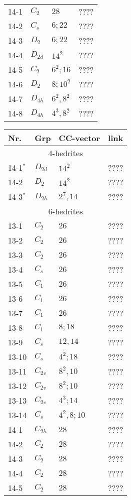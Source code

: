 \documentclass[12pt]{article}
\begin{document}
\begin{table}
\begin{center}
{\begin{minipage}{6cm}
\begin{tabular}{||l|l|l|l||}
14-1	&$C_2$	&$28$		&????\\
14-2	&$C_s$	&$6; 22$		&????\\
14-3	&$D_2$	&$6; 22$		&????\\
14-4	&$D_{2d}$	&$14^2$		&????\\
14-5	&$C_2$	&$6^2; 16$	&????\\
14-6	&$D_2$	&$8; 10^2$	&????\\
14-7	&$D_{4h}$	&$6^2, 8^2$	&????\\
14-8	&$D_{4h}$	&$4^3, 8^2$	&????\\\hline
\end{tabular}
\end{minipage}
\begin{minipage}[t]{6cm}
\begin{tabular}{||l|l|l|l||}
\hline
Nr.	&Grp 	&CC-vector	&link\\\hline
\multicolumn{4}{||c||}{$4$-hedrites}\\\hline
14-1${}^*$&$D_{2d}$	&$14^2$		&????\\\hline
14-2	&$D_2$	&$14^2$		&????\\	
14-3${}^*$&$D_{2h}$       &$2^7, 14$      &????\\
\hline
\multicolumn{4}{||c||}{$6$-hedrites}\\\hline
13-1	&$C_2$	&$26$		&????\\
13-2 	&$C_2$	&$26$		&????\\
13-3 	&$C_2$	&$26$		&????\\
13-4 	&$C_s$	&$26$		&????\\
13-5 	&$C_1$	&$26$		&????\\
13-6	&$C_1$	&$26$		&????\\
13-7	&$C_1$	&$26$		&????\\
13-8	&$C_1$	&$8; 18$		&????\\
13-9	&$C_s$	&$12, 14$		&????\\
13-10	&$C_s$	&$4^2; 18$	&????\\
13-11	&$C_{2v}$	&$8^2, 10$	&????\\
13-12	&$C_{2v}$	&$8^2; 10$	&????\\
13-13	&$C_{2v}$	&$4^3; 14$	&????\\
13-14	&$C_s$	&$4^2,8;10$	&????\\\hline
14-1 	&$C_{2h}$	&$28$		&????\\
14-2	&$C_{2}$	&$28$		&????\\
14-3	&$C_2$	&$28$		&????\\
14-4 	&$C_2$	&$28$		&????\\
14-5 	&$C_2$	&$28$		&????\\

\end{tabular}
\end{minipage}}
\end{center}
\end{table}
\end{document}
